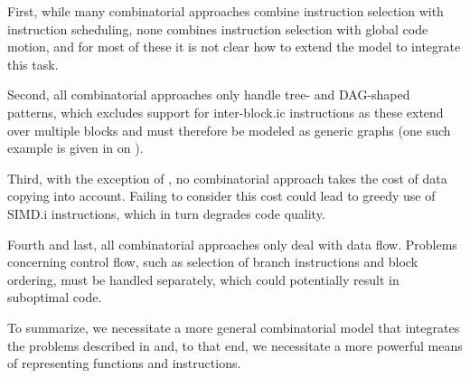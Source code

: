 First, while many combinatorial approaches combine \gls{instruction
  selection} with \gls{instruction scheduling}, none combines \gls{instruction
  selection} with \gls{global code motion}, and for most of these it is not
clear how to extend the model to integrate this task.

Second, all combinatorial approaches only handle \gls{tree}- and
\gls{DAG}-shaped \glspl{pattern}, which excludes support for
\gls{inter-block.ic} \glspl{instruction} as these extend over multiple
\glspl{block} and must therefore be modeled as generic \glspl{graph} (one such
example is given in 
on ).

Third, with the exception of \textcite{TanakaEtAl:2003}, no combinatorial
approach takes the cost of \gls{data copying} into account.
%
Failing to consider this cost could lead to greedy use of \gls{SIMD.i}
\glspl{instruction}, which in turn degrades code quality.

Fourth and last, all combinatorial approaches only deal with data flow.
%
Problems concerning control flow, such as selection of branch
\glspl{instruction} and \gls{block ordering}, must be handled separately, which
could potentially result in suboptimal code.

To summarize, we necessitate a more general combinatorial model that integrates
the problems described in  and, to that end, we
necessitate a more powerful means of representing \glspl{function} and
\glspl{instruction}.
